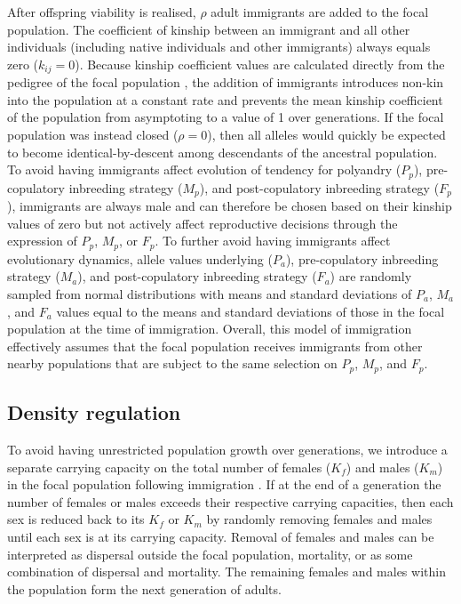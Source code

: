 \documentclass[10pt,letterpaper]{article}
\begin{document}
After offspring viability is realised, $\rho$ adult immigrants are added to the focal population. The coefficient of kinship between an immigrant and all other individuals (including native individuals and other immigrants) always equals zero ($k_{ij}=0$). Because kinship coefficient values are calculated directly from the pedigree of the focal population \cite[not from individuals' genomes; see][]{Duthie}, the addition of immigrants introduces non-kin into the population at a constant rate and prevents the mean kinship coefficient of the population from asymptoting to a value of 1 over generations. If the focal population was instead closed ($\rho=0$), then all alleles would quickly be expected to become identical-by-descent among descendants of the ancestral population. To avoid having immigrants affect evolution of tendency for polyandry ($P_{p}$), pre-copulatory inbreeding strategy ($M_{p}$), and post-copulatory inbreeding strategy ($F_{p}$), immigrants are always male and can therefore be chosen based on their kinship values of zero but not actively affect reproductive decisions through the expression of $P_{p}$, $M_{p}$, or $F_{p}$. To further avoid having immigrants affect evolutionary dynamics, allele values underlying ($P_{a}$), pre-copulatory inbreeding strategy ($M_{a}$), and post-copulatory inbreeding strategy ($F_{a}$) are randomly sampled from normal distributions with means and standard deviations of $P_{a}$, $M_{a}$, and $F_{a}$ values equal to the means and standard deviations of those in the focal population at the time of immigration. Overall, this model of immigration effectively assumes that the focal population receives immigrants from other nearby populations that are subject to the same selection on $P_{p}$, $M_{p}$, and $F_{p}$.

\subsection*{Density regulation}

To avoid having unrestricted population growth over generations, we introduce a separate carrying capacity on the total number of females ($K_{f}$) and males ($K_{m}$) in the focal population following immigration \cite[][]{Guillaume2009, Duthie}. If at the end of a generation the number of females or males exceeds their respective carrying capacities, then each sex is reduced back to its $K_{f}$ or $K_{m}$ by randomly removing females and males until each sex is at its carrying capacity. Removal of females and males can be interpreted as dispersal outside the focal population, mortality, or as some combination of dispersal and mortality. The remaining females and males within the population form the next generation of adults.
\end{document}
